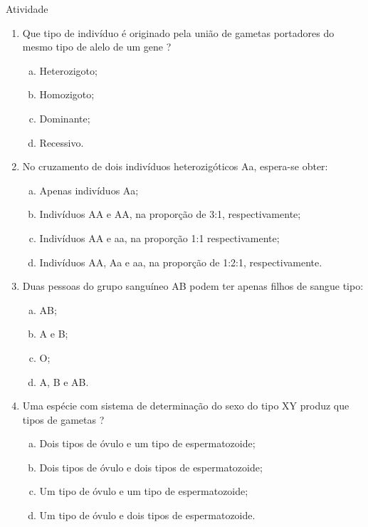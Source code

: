 \documentclass[11pt]{article}
\begin{document}
  \begin{center}
    Atividade
  \end{center}

  \begin{enumerate}
    \item Que tipo de indivíduo é originado pela união de gametas portadores do mesmo tipo de alelo de um gene ?
      \begin{enumerate}[(a)]
        \item Heterozigoto;
        \item Homozigoto;
        \item Dominante;
        \item Recessivo.
      \end{enumerate}


    \item No cruzamento de dois indivíduos heterozigóticos  Aa, espera-se obter:
      \begin{enumerate}[(a)]
        \item Apenas indivíduos Aa;
        \item Indivíduos AA e AA, na proporção de 3:1, respectivamente;
        \item Indivíduos AA e aa, na proporção 1:1 respectivamente;
        \item Indivíduos AA, Aa e aa, na proporção de 1:2:1, respectivamente.
      \end{enumerate}

    \item Duas pessoas do grupo sanguíneo AB podem ter apenas filhos de sangue tipo:
      \begin{enumerate}[(a)]
        \item AB;
        \item A e B;
        \item O;
        \item A, B e AB.
      \end{enumerate}

    \item Uma espécie com sistema de determinação do sexo do tipo XY produz que tipos de gametas ?
      \begin{enumerate}[(a)]
        \item Dois tipos de óvulo e um tipo de espermatozoide;
        \item Dois tipos de óvulo e dois tipos de espermatozoide;
        \item Um tipo de óvulo e um tipo de espermatozoide;
        \item Um tipo de óvulo e dois tipos de espermatozoide.
      \end{enumerate}
  \end{enumerate}
\end{document}
